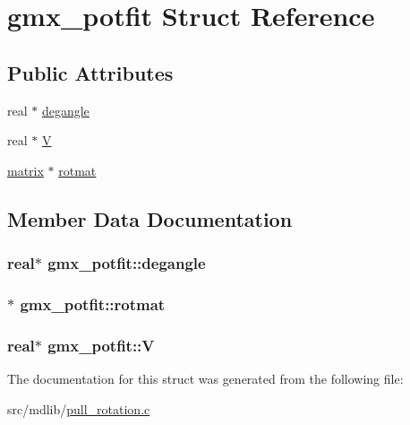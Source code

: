 \hypertarget{structgmx__potfit}{\section{gmx\-\_\-potfit \-Struct \-Reference}
\label{structgmx__potfit}
}
\subsection*{\-Public \-Attributes}
\begin{DoxyCompactItemize}
\item 
real $\ast$ \hyperlink{structgmx__potfit_a2a8438cb2c51067eba63303629530384}{degangle}
\item 
real $\ast$ \hyperlink{structgmx__potfit_a799ec5d1e7c3cf22e8e5fb92cb72abef}{\-V}
\item 
\hyperlink{share_2template_2gromacs_2types_2simple_8h_a7ea9c2a830d3f743b887387e33645a83}{matrix} $\ast$ \hyperlink{structgmx__potfit_a2be23c8803734a28c72c00e76998e94a}{rotmat}
\end{DoxyCompactItemize}


\subsection{\-Member \-Data \-Documentation}
\hypertarget{structgmx__potfit_a2a8438cb2c51067eba63303629530384}{
\subsubsection[{degangle}]{\setlength{\rightskip}{0pt plus 5cm}real$\ast$ {\bf gmx\-\_\-potfit\-::degangle}}}\label{structgmx__potfit_a2a8438cb2c51067eba63303629530384}
\hypertarget{structgmx__potfit_a2be23c8803734a28c72c00e76998e94a}{
\subsubsection[{rotmat}]{$\ast$ {\bf gmx\-\_\-potfit\-::rotmat}}}\label{structgmx__potfit_a2be23c8803734a28c72c00e76998e94a}
\hypertarget{structgmx__potfit_a799ec5d1e7c3cf22e8e5fb92cb72abef}{
\subsubsection[{\-V}]{\setlength{\rightskip}{0pt plus 5cm}real$\ast$ {\bf gmx\-\_\-potfit\-::\-V}}}\label{structgmx__potfit_a799ec5d1e7c3cf22e8e5fb92cb72abef}


\-The documentation for this struct was generated from the following file\-:\begin{DoxyCompactItemize}
\item 
src/mdlib/\hyperlink{pull__rotation_8c}{pull\-\_\-rotation.\-c}\end{DoxyCompactItemize}
